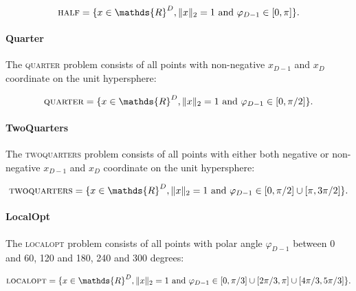 \[
    \textsc{half} = \{x \in \mathds{R}^D, \lVert x \rVert_2 = 1 \text{ and } \varphi_{D-1} \in [0, \pi]\}.
\]

\paragraph{Quarter}
The \textsc{quarter} problem consists of all points with non-negative $x_{D-1}$ and $x_D$ coordinate on the unit hypersphere:

\[
    \textsc{quarter} = \{x \in \mathds{R}^D, \lVert x \rVert_2 = 1 \text{ and } \varphi_{D-1} \in [0, \pi / 2]\}.
\]

\paragraph{TwoQuarters}
The \textsc{twoquarters} problem consists of all points with either both negative or non-negative $x_{D-1}$ and $x_D$ coordinate on the unit hypersphere:

\[
    \textsc{twoquarters} = \{x \in \mathds{R}^D, \lVert x \rVert_2 = 1 \text{ and } \varphi_{D-1} \in [0, \pi / 2] \cup [\pi, 3\pi / 2]\}.
\]

\paragraph{LocalOpt}
The \textsc{localopt} problem consists of all points with polar angle $\varphi_{D-1}$ between 0 and 60, 120 and 180, 240 and 300 degrees:

\[
    \textsc{localopt} = \{x \in \mathds{R}^D, \lVert x \rVert_2 = 1 \text{ and } \varphi_{D-1} \in [0, \pi / 3] \cup [2\pi / 3, \pi] \cup [4\pi / 3, 5\pi / 3]\}.
\]


